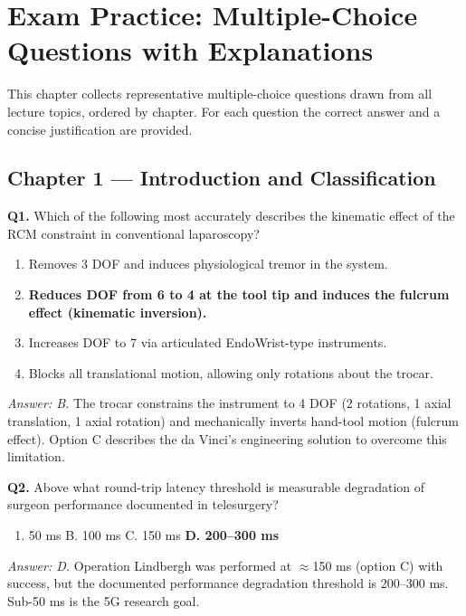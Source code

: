 \documentclass[11pt,a4paper,twoside]{report}
\begin{document}
\chapter{Exam Practice: Multiple-Choice Questions with Explanations}

This chapter collects representative multiple-choice questions drawn from all lecture topics, ordered by chapter. For each question the correct answer and a concise justification are provided.

\section{Chapter 1 — Introduction and Classification}

\textbf{Q1.} Which of the following most accurately describes the kinematic effect of the RCM constraint in conventional laparoscopy?
\begin{enumerate}[label=\Alph*.]
    \item Removes 3 DOF and induces physiological tremor in the system.
    \item \textbf{Reduces DOF from 6 to 4 at the tool tip and induces the fulcrum effect (kinematic inversion).}
    \item Increases DOF to 7 via articulated EndoWrist-type instruments.
    \item Blocks all translational motion, allowing only rotations about the trocar.
\end{enumerate}
\textit{Answer: B.} The trocar constrains the instrument to 4 DOF (2 rotations, 1 axial translation, 1 axial rotation) and mechanically inverts hand-tool motion (fulcrum effect). Option C describes the da Vinci's engineering solution to overcome this limitation.

\bigskip
\textbf{Q2.} Above what round-trip latency threshold is measurable degradation of surgeon performance documented in telesurgery?
\begin{enumerate}[label=\Alph*.]
    \item 50 ms \quad B. 100 ms \quad C. 150 ms \quad \textbf{D. 200--300 ms}
\end{enumerate}
\textit{Answer: D.} Operation Lindbergh was performed at $\approx$150 ms (option C) with success, but the documented performance degradation threshold is 200--300 ms. Sub-50 ms is the 5G research goal.
\end{document}
